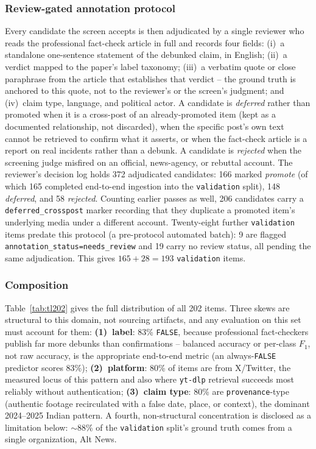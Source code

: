 \documentclass[conference]{IEEEtran}
\begin{document}
\subsubsection{Review-gated annotation protocol}
Every candidate the screen accepts is then adjudicated by a single
reviewer who reads the professional fact-check article in full and
records four fields: (i)~a standalone one-sentence statement of the
debunked claim, in English; (ii)~a verdict mapped to the paper's
label taxonomy; (iii)~a verbatim quote or close paraphrase from the
article that establishes that verdict -- the ground truth is anchored to
this quote, not to the reviewer's or the screen's judgment; and
(iv)~claim type, language, and political actor. A candidate is
\emph{deferred} rather than promoted when it is a cross-post of an
already-promoted item (kept as a documented relationship, not discarded),
when the specific post's own text cannot be retrieved to confirm what it
asserts, or when the fact-check article is a report on real incidents
rather than a debunk. A candidate is \emph{rejected} when the screening
judge misfired on an official, news-agency, or rebuttal account. The
reviewer's decision log holds 372 adjudicated candidates: 166 marked
\emph{promote} (of which 165 completed end-to-end ingestion into the
\texttt{validation} split), 148 \emph{deferred}, and 58 \emph{rejected}.
Counting earlier passes as well, 206 candidates carry a
\texttt{deferred\_crosspost} marker recording that they duplicate a
promoted item's underlying media under a different account. Twenty-eight
further \texttt{validation} items predate this protocol (a pre-protocol
automated batch): 9 are flagged
\texttt{annotation\_status=needs\_review} and 19 carry no review status,
all pending the same adjudication. This gives $165+28=193$
\texttt{validation} items.

\subsubsection{Composition}
Table~\ref{tab:tl202} gives the full distribution of all 202 items.
Three skews are structural to this domain, not sourcing artifacts, and
any evaluation on this set must account for them:
\textbf{(1)~label}: 83\% \texttt{FALSE}, because professional
fact-checkers publish far more debunks than confirmations -- balanced
accuracy or per-class $F_1$, not raw accuracy, is the appropriate
end-to-end metric (an always-\texttt{FALSE} predictor scores 83\%);
\textbf{(2)~platform}: 80\% of items are from X/Twitter, the measured
locus of this pattern and also where \texttt{yt-dlp} retrieval succeeds
most reliably without authentication; \textbf{(3)~claim type}: 80\% are
\texttt{provenance}-type (authentic footage recirculated with a false
date, place, or context), the dominant 2024--2025 Indian pattern.
A fourth, non-structural concentration is disclosed as a limitation
below: $\sim$88\% of the \texttt{validation} split's ground truth comes
from a single organization, Alt News.
\end{document}
